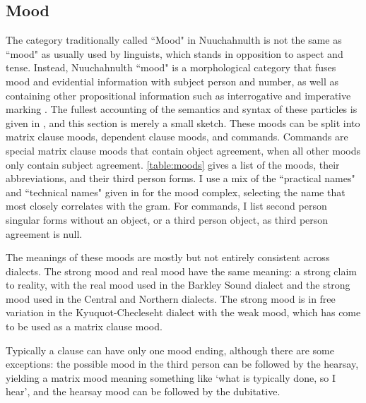 \subsection{Mood} \label{sec:grams:mood}

The category traditionally called ``Mood" in Nuuchahnulth is not the same as ``mood" as usually used by linguists, which stands in opposition to aspect and tense. Instead, Nuuchahnulth ``mood" is a morphological category that fuses mood and evidential information with subject person and number, as well as containing other propositional information such as interrogative and imperative marking \citep{jacobsen1986}. The fullest accounting of the semantics and syntax of these particles is given in \citet[Chapter 4]{waldie2012}, and this section is merely a small sketch. These moods can be split into matrix clause moods, dependent clause moods, and commands. Commands are special matrix clause moods that contain object agreement, when all other moods only contain subject agreement. \cref{table:moods} gives a list of the moods, their abbreviations, and their third person forms. I use a mix of the ``practical names" and ``technical names" given in \citet{werle2015} for the mood complex, selecting the name that most closely correlates with the gram. For commands, I list second person singular forms without an object, or a third person object, as third person agreement is null.

The meanings of these moods are mostly but not entirely consistent across dialects. The strong mood and real mood have the same meaning: a strong claim to reality, with the real mood used in the Barkley Sound dialect and the strong mood used in the Central and Northern dialects. The strong mood is in free variation in the Kyuquot-Checleseht dialect with the weak mood, which has come to be used as a matrix clause mood.

Typically a clause can have only one mood ending, although there are some exceptions: the possible mood in the third person can be followed by the hearsay, yielding a matrix mood meaning something like `what is typically done, so I hear', and the hearsay mood can be followed by the dubitative.

\newpage

